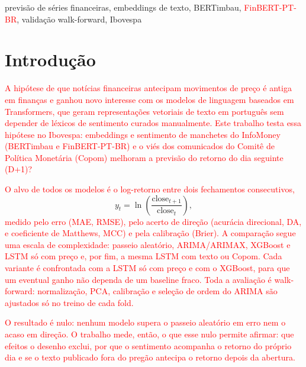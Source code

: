 \documentclass[conference]{IEEEtran}
\newcommand{\novo}[1]{\textcolor{red}{#1}}
\begin{document}
\begin{IEEEkeywords}
previs\~ao de s\'eries financeiras, embeddings de texto, BERTimbau, \novo{FinBERT-PT-BR}, valida\c{c}\~ao walk-forward, Ibovespa
\end{IEEEkeywords}

\section{Introdu\c{c}\~ao}

\novo{A hip\'otese de que not\'icias financeiras antecipam movimentos de pre\c{c}o \'e antiga em finan\c{c}as e ganhou novo interesse com os modelos de linguagem baseados em Transformers, que geram representa\c{c}\~oes vetoriais de texto em portugu\^es sem depender de l\'exicos de sentimento curados manualmente. Este trabalho testa essa hip\'otese no Ibovespa: embeddings e sentimento de manchetes do InfoMoney (BERTimbau e FinBERT-PT-BR) e o vi\'es dos comunicados do Comit\^e de Pol\'itica Monet\'aria (Copom) melhoram a previs\~ao do retorno do dia seguinte (D+1)?}

\novo{O alvo de todos os modelos \'e o log-retorno entre dois fechamentos consecutivos,}
\begin{equation}
y_t = \ln\!\left(\frac{\text{close}_{t+1}}{\text{close}_t}\right),
\label{eq:target}
\end{equation}
\novo{medido pelo erro (MAE, RMSE), pelo acerto de dire\c{c}\~ao (acur\'acia direcional, DA, e coeficiente de Matthews, MCC) e pela calibra\c{c}\~ao (Brier). A compara\c{c}\~ao segue uma escala de complexidade: passeio aleat\'orio, ARIMA/ARIMAX, XGBoost e LSTM s\'o com pre\c{c}o e, por fim, a mesma LSTM com texto ou Copom. Cada variante \'e confrontada com a LSTM s\'o com pre\c{c}o e com o XGBoost, para que um eventual ganho n\~ao dependa de um baseline fraco. Toda a avalia\c{c}\~ao \'e walk-forward: normaliza\c{c}\~ao, PCA, calibra\c{c}\~ao e sele\c{c}\~ao de ordem do ARIMA s\~ao ajustados s\'o no treino de cada fold.}

\novo{O resultado \'e nulo: nenhum modelo supera o passeio aleat\'orio em erro nem o acaso em dire\c{c}\~ao. O trabalho mede, ent\~ao, o que esse nulo permite afirmar: que efeitos o desenho exclui, por que o sentimento acompanha o retorno do pr\'oprio dia e se o texto publicado fora do preg\~ao antecipa o retorno depois da abertura.}
\end{document}
